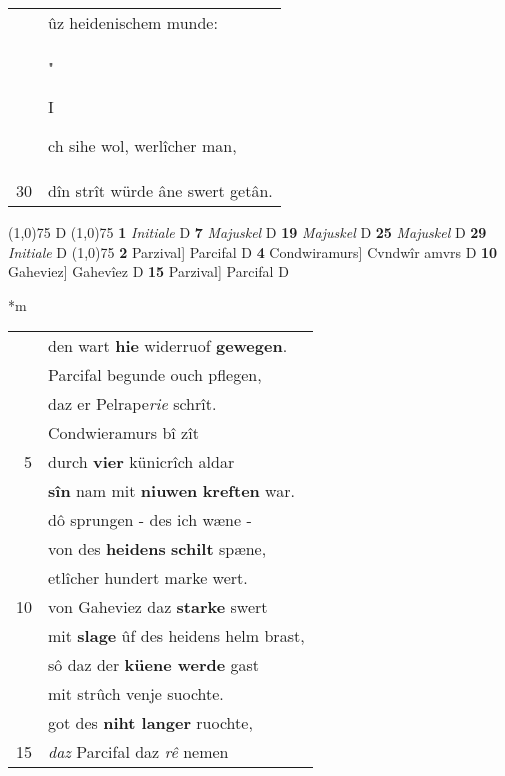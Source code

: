\documentclass[8pt,a4paper,notitlepage]{article}
\begin{document}
\begin{table}[ht]
\begin{minipage}[t]{0.5\linewidth}
\begin{tabular}{rl}
 & ûz heidenischem munde:\\ 
 & "\begin{large}I\end{large}ch sihe wol, werlîcher man,\\ 
30 & dîn strît würde âne swert getân.\\ 
\end{tabular}
\scriptsize
\line(1,0){75} \newline
D \newline
\line(1,0){75} \newline
\textbf{1} \textit{Initiale} D  \textbf{7} \textit{Majuskel} D  \textbf{19} \textit{Majuskel} D  \textbf{25} \textit{Majuskel} D  \textbf{29} \textit{Initiale} D  \newline
\line(1,0){75} \newline
\textbf{2} Parzival] Parcifal D \textbf{4} Condwiramurs] Cvndwîr amvrs D \textbf{10} Gaheviez] Gahevîez D \textbf{15} Parzival] Parcifal D \newline
\end{minipage}
\hspace{0.5cm}
\begin{minipage}[t]{0.5\linewidth}
\small
\begin{center}*m
\end{center}
\begin{tabular}{rl}
 & den wart \textbf{hie} widerruof \textbf{gewegen}.\\ 
 & Parcifal begunde ouch pflegen,\\ 
 & daz er Pelrape\textit{rie} schrît.\\ 
 & Condwieramurs bî zît\\ 
5 & durch \textbf{vier} künicrîch aldar\\ 
 & \textbf{sîn} nam mit \textbf{niuwen} \textbf{kreften} war.\\ 
 & dô sprungen - des ich wæne -\\ 
 & von des \textbf{heidens} \textbf{schilt} spæne,\\ 
 & etlîcher hundert marke wert.\\ 
10 & von Gaheviez daz \textbf{starke} swert\\ 
 & mit \textbf{slage} ûf des heidens helm brast,\\ 
 & sô daz der \textbf{küene werde} gast\\ 
 & mit strûch venje suochte.\\ 
 & got des \textbf{niht langer} ruochte,\\ 
15 & \textit{daz} Parcifal daz \textit{rê} nemen\\ 

\end{tabular}
\end{minipage}
\end{table}
\end{document}
